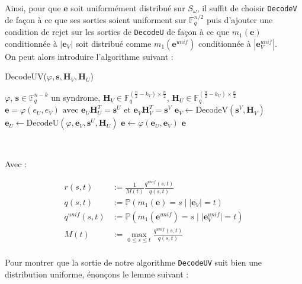 \documentclass[12pt]{article}
\theoremstyle{plain}
\theoremstyle{definition}
\newcommand{\F}{\mathbb{F}}
\newcommand{\e}{\mathbf{e}}
\newcommand{\s}{\mathbf{s}}
\begin{document}
\noindent Ainsi, pour que $\mathbf{e}$ soit uniformément distribué sur $S_\omega$, il suffit de choisir \verb|DecodeV| de façon à ce que ses sorties soient uniforment sur $\F_q^{n/2}$ puis d'ajouter une condition de rejet sur les sorties de \verb|DecodeU| de façon à ce que $m_1(\mathbf{e})$ conditionnée à $|\mathbf{e}_V|$ soit distribué comme $m_1(\mathbf{e}^{unif})$ conditionnée à $|\mathbf{e}_V^{unif}|$. \\
On peut alors introduire l'algorithme suivant :
\begin{algorithm}
	\caption{DecodeUV($\varphi, \s, \mathbf{H}_V, \mathbf{H}_U$)}
	\begin{algorithmic}[1]
   	 	\REQUIRE $\varphi$, $\s \in \F_q^{n-k}$ un syndrome, $\mathbf{H}_V \in \F_q^{(\frac{n}{2} - k_V) \times \frac{n}{2}}$, $\mathbf{H}_U \in \F_q^{(\frac{n}{2} - k_U) \times \frac{n}{2}}$
   	 	\ENSURE $\e = \varphi(e_U, e_V) \text{ avec } \e_U\mathbf{H}_U^T = \s^U \text{ et } \e_V\mathbf{H}_V^T = \s^V$
    	\STATE $\e_V \leftarrow \text {DecodeV}(\s^V,\mathbf{H}_V)$
    	\REPEAT 
    	\STATE $\e_U \leftarrow \text {DecodeU}(\varphi, \e_V, \s^U, \mathbf{H}_U)$
    	\STATE $\e \leftarrow \varphi(\e_U,\e_V)$
    	\UNTIL {$\text{rand}([0,1]) > \mathbf{r}_U(|\e_V|, m_1(\e))$}
    	\RETURN $\e$
    \end{algorithmic}
\end{algorithm}\


\noindent Avec :

\begin{equation*}
   \begin{split}
    r(s,t) &:= \frac{1}{M(t)}\frac{q^{unif}(s,t)}{q(s,t)}\\[.6cm]
    q(s,t) &:= \mathbb{P}(m_1(\mathbf{e})=s\;|\;|\mathbf{e}_V|=t)\\[.6cm]
    q^{unif}(s,t) &:= \mathbb{P}(m_1(\mathbf{e}^{unif})=s\;|\;|\mathbf{e}^{unif}_V|=t)\\[.6cm]
    M(t) &:= \max_{0 \leq s \leq t} \frac{q^{unif}(s,t)}{q(s,t)}\\[.6cm]
    \end{split}
\end{equation*}



Pour montrer que la sortie de notre algorithme \verb|DecodeUV| suit bien une distribution uniforme, énonçons le lemme suivant :
\end{document}
